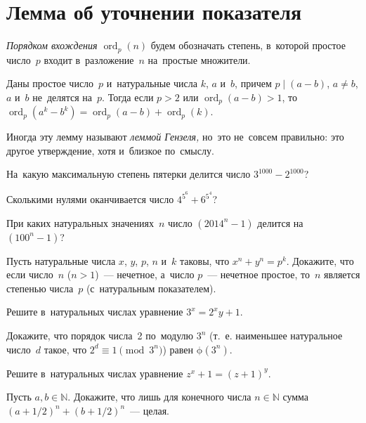 
\section*{Лемма об уточнении показателя}


\begingroup
    \def\divides{\mathrel{\vert}}
    \ifx\mathup\undefined
        \def\eulerphi{\upphi}
    \else
        \def\eulerphi{\mathup{\phi}}
    \fi
    \def\ord{\operatorname{ord}}

\emph{Порядком вхождения $\ord_p (n)$} будем обозначать степень, в~которой
простое число~$p$ входит в~разложение~$n$ на~простые множители.

Даны простое число~$p$ и~натуральные числа $k$, $a$ и~$b$, причем
$p \divides (a - b)$, $a \neq b$, $a$ и~$b$ не~делятся на~$p$.
Тогда если $p > 2$ или $\ord_p (a - b) > 1$,
то~$\ord_p (a^k - b^k) = \ord_p (a - b) + \ord_p(k)$.

Иногда эту лемму называют \emph{леммой Гензеля,} но~это не~совсем правильно:
это другое утверждение, хотя и~близкое по~смыслу.

\begin{problems}

\item
На~какую максимальную степень пятерки делится число $3^{1000} - 2^{1000}$?

\item
Сколькими нулями оканчивается число $4^{5^6} + 6^{5^4}$?

\item
При каких натуральных значениях~$n$ число $(2014^n - 1)$ делится
на~$(100^n - 1)$?

\item
Пусть натуральные числа $x$, $y$, $p$, $n$ и~$k$ таковы, что
$x^n + y^n = p^k$.
Докажите, что если число~$n$ ($n > 1$)~--- нечетное, а~число $p$~--- нечетное
простое, то~$n$ является степенью числа~$p$ (с~натуральным показателем).

\item
Решите в~натуральных числах уравнение $3^{x} = 2^{x} y + 1$.

\item
Докажите, что порядок числа~2 по~модулю $3^n$ (т.~е. наименьшее натуральное
число~$d$ такое, что $2^d \equiv 1 \pmod{3^{n}}$) равен $\eulerphi(3^n)$.

\item
Решите в~натуральных числах уравнение $z^x + 1 = (z + 1)^y$.

\item
Пусть $a, b \in \mathbb{N}$.
Докажите, что лишь для конечного числа $n \in \mathbb{N}$ сумма
$\left( a + 1/2 \right)^n + \left( b + 1/2 \right)^n$~--- целая.

\end{problems}

\endgroup %

